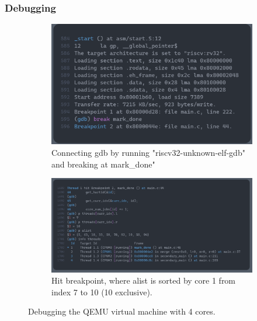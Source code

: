 \subsubsection*{Debugging}
\begin{figure}
  \centering
  \begin{subfigure}[b]{0.45\textwidth}
    \centering
    \includegraphics[width=\textwidth]{./figures/debug1.png}
    \caption{Connecting gdb by running "riscv32-unknown-elf-gdb" and breaking at
    mark\_done"}
  \end{subfigure}
  \hfill
  \begin{subfigure}[b]{0.45\textwidth}
    \centering
    \includegraphics[width=\textwidth]{./figures/debug2.png}
    \caption{Hit breakpoint, where alist is sorted by core 1 from
    index 7 to 10 (10 exclusive).}
  \end{subfigure}
  \caption{Debugging the QEMU virtual machine with 4 cores.}\label{fig:debug}
\end{figure}

